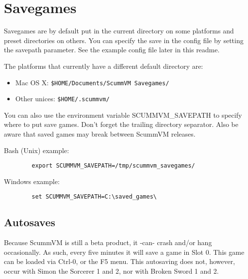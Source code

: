 


\section{Savegames}

Savegames are by default put in the current directory on some platforms and
preset directories on others.  You can specify the save in the config file by
setting the savepath parameter. See the example config file later in this
readme.

The platforms that currently have a different default directory are:
%
\begin{itemize}
\item Mac OS X: \verb#$HOME/Documents/ScummVM Savegames/#
\item Other unices: \verb#$HOME/.scummvm/#
\end{itemize}
%
You can also use the environment variable SCUMMVM\_SAVEPATH to specify where to
put save games. Don't forget the trailing directory separator. Also be aware
that saved games may break between ScummVM releases.

Bash (Unix) example:
\begin{verbatim}
        export SCUMMVM_SAVEPATH=/tmp/scummvm_savegames/
\end{verbatim}
Windows example:
\begin{verbatim}
        set SCUMMVM_SAVEPATH=C:\saved_games\
\end{verbatim}


\subsection{Autosaves}

Because ScummVM is still a beta product, it -can- crash and/or hang
occasionally. As such, every five minutes it will save a game in Slot 0. This
game can be loaded via Ctrl-0, or the F5 menu. This autosaving does not,
however, occur with Simon the Sorcerer 1 and 2, nor with Broken Sword 1 and 2.

